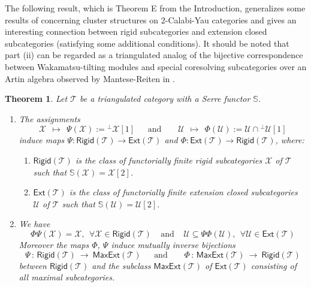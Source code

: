 \documentclass[oneside, a4paper,reqno]{amsart}
\numberwithin{equation}{section}
\newtheorem{thm}{Theorem}[section]
\theoremstyle{definition}
\begin{document}
The following result, which is Theorem E from the Introduction, generalizes some results of \cite{BIRS} concerning cluster structures on $2$-Calabi-Yau categories and  gives an interesting connection between rigid subcategories and extension closed subcategories (satisfying some additional conditions).  It should be noted that part (ii) can be regarded as a triangulated analog of the bijective correspondence between Wakamatsu-tilting modules and special coresolving subcategories over an Artin algebra observed by Mantese-Reiten in \cite[Theorems $2.10$, $3.4$]{MR}.   

\begin{thm} Let ${\mathcal T}$ be a triangulated category  with a Serre functor $\mathbb S$. 
\begin{enumerate}
\item The assignments   
\[
 {\mathcal X} \ \ \longmapsto \ \ \Psi({\mathcal X}) := {^{\bot}}{\mathcal X}[1] \ \ \ \ \ \ \ \text{and} \ \ \ \ \ \ \ \ \ 
  {\mathcal U} \ \ \longmapsto \ \ \Phi({\mathcal U}) := {\mathcal U} \cap {^{\bot}}{\mathcal U}[1]
\]
induce maps $\Psi \colon \mathsf{Rigid}({\mathcal T}) {\longrightarrow} \mathsf{Ext}({\mathcal T})$ and $\Phi \colon \mathsf{Ext}({\mathcal T}) {\longrightarrow} \mathsf{Rigid}({\mathcal T})$, where:
\begin{enumerate}
\item $\mathsf{Rigid}({\mathcal T})$  is the class of functorially finite rigid subcategories ${\mathcal X}$ of ${\mathcal T}$ such that $\mathbb S({\mathcal X}) = {\mathcal X}[2]$.
\item $\mathsf{Ext}({\mathcal T})$ is the class of functorially finite extension closed subcategories ${\mathcal U}$ of ${\mathcal T}$ such that $\mathbb S({\mathcal U}) = {\mathcal U}[2]$. 
\end{enumerate}
\item We have  
\[
\Phi\Psi({\mathcal X}) = {\mathcal X}, \ \ \forall {\mathcal X} \in \mathsf{Rigid}({\mathcal T}) \ \ \ \ \   \text{and}  \ \ \ \ \ {\mathcal U} \subseteq \Psi\Phi({\mathcal U}),  \ \ \forall {\mathcal U} \in \mathsf{Ext}({\mathcal T})
\] Moreover  the maps $\Phi$, $\Psi$ induce  mutually inverse bijections 
\[
\Psi \,  \colon \,   \mathsf{Rigid}({\mathcal T}) \  {\longrightarrow} \  \mathsf{MaxExt}({\mathcal T}) \ \ \ \ \ \ \ \text{and} \ \ \ \ \ \ \ \ \ 
\Phi \, \colon \,  \mathsf{MaxExt}({\mathcal T}) \  {\longrightarrow} \  \mathsf{Rigid}({\mathcal T}) 
\]
between $\mathsf{Rigid}({\mathcal T})$ and the subclass $\mathsf{MaxExt}({\mathcal T})$  of $\mathsf{Ext}({\mathcal T})$ consisting of all maximal subcategories. 

\end{enumerate}
\end{thm}
\end{document}
